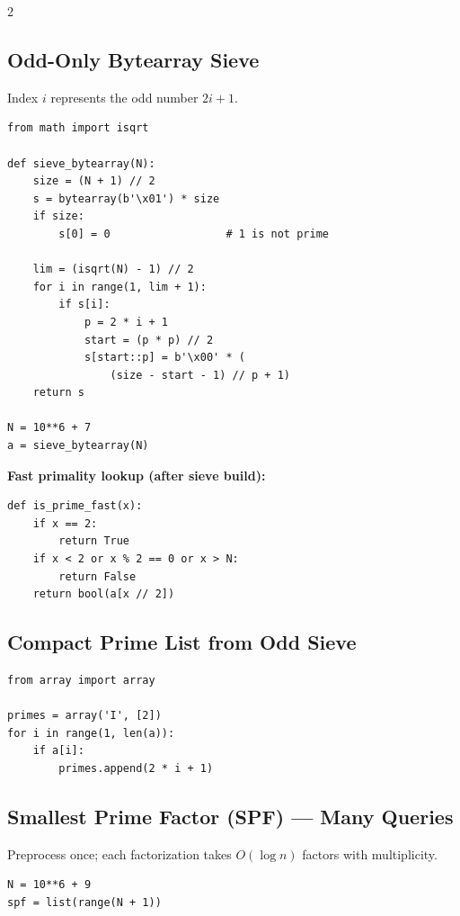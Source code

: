 \documentclass[9pt,a4paper]{extarticle}
\begin{document}
\begin{multicols}{2}
\subsection{Odd-Only Bytearray Sieve}
Index $i$ represents the odd number $2i+1$.
\begin{lstlisting}
from math import isqrt

def sieve_bytearray(N):
    size = (N + 1) // 2
    s = bytearray(b'\x01') * size
    if size:
        s[0] = 0                  # 1 is not prime

    lim = (isqrt(N) - 1) // 2
    for i in range(1, lim + 1):
        if s[i]:
            p = 2 * i + 1
            start = (p * p) // 2
            s[start::p] = b'\x00' * (
                (size - start - 1) // p + 1)
    return s

N = 10**6 + 7
a = sieve_bytearray(N)
\end{lstlisting}

\par\noindent\begin{minipage}[t]{\linewidth}
\textbf{Fast primality lookup (after sieve build):}
\begin{lstlisting}
def is_prime_fast(x):
    if x == 2:
        return True
    if x < 2 or x % 2 == 0 or x > N:
        return False
    return bool(a[x // 2])
\end{lstlisting}
\end{minipage}\par

\par\noindent\begin{minipage}[t]{\linewidth}
\subsection{Compact Prime List from Odd Sieve}
\begin{lstlisting}
from array import array

primes = array('I', [2])
for i in range(1, len(a)):
    if a[i]:
        primes.append(2 * i + 1)
\end{lstlisting}
\end{minipage}\par
\subsection{Smallest Prime Factor (SPF) --- Many Queries}
Preprocess once; each factorization takes $O(\log n)$ factors with multiplicity.
\begin{lstlisting}
N = 10**6 + 9
spf = list(range(N + 1))


\end{lstlisting}
\end{multicols}
\end{document}
